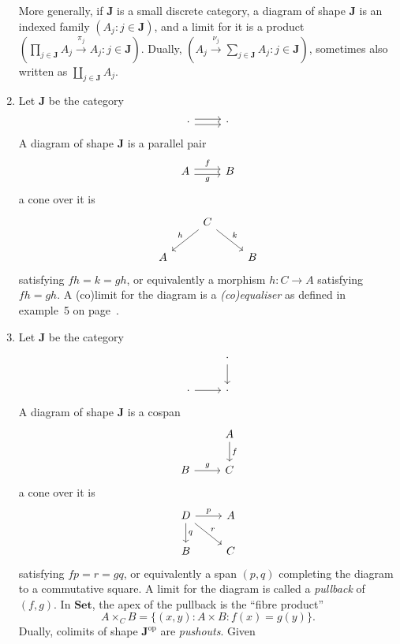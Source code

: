 \documentclass[a4paper]{article}
\renewcommand{\c}[1]{\mathbf{#1}}
\newcommand{\Set}{{\c{Set}}}
\begin{document}
\begin{eg}
\begin{enumerate}
    More generally, if \(\c J\) is a small discrete category, a diagram of shape \(\c J\) is an indexed family \((A_j: j \in \c J)\), and a limit for it is a product \((\prod_{j \in \c J} A_j \xrightarrow{\pi_j} A_j: j \in \c J)\). Dually, \((A_j \xrightarrow{\nu_j} \sum_{j \in \c J} A_j: j\in \c J)\), sometimes also written as \(\coprod_{j \in \c J} A_j\).
  \item Let \(\c J\) be the category
    \[
      \begin{tikzcd}
        \cdot \ar[r, shift left] \ar[r, shift right] & \cdot
      \end{tikzcd}
    \]
    A diagram of shape \(\c J\) is a parallel pair
    \[
      \begin{tikzcd}
        A \ar[r, shift left, "f"] \ar[r, shift right, "g"'] & B
      \end{tikzcd}
    \]
    a cone over it is
    \[
      \begin{tikzcd}
        & C \ar[dl, "h"'] \ar[dr, "k"] \\
        A & & B
      \end{tikzcd}
    \]
    satisfying \(fh = k = gh\), or equivalently a morphism \(h: C \to A\) satisfying \(fh = gh\). A (co)limit for the diagram is a \emph{(co)equaliser} as defined in example~5 on page~\pageref{eg:representable functor}.
  \item Let \(\c J\) be the category
    \[
      \begin{tikzcd}
        & \cdot \ar[d] \\
        \cdot \ar[r] & \cdot
      \end{tikzcd}
    \]
    A diagram of shape \(\c J\) is a cospan
    \[
      \begin{tikzcd}
        & A \ar[d, "f"] \\
        B \ar[r, "g"] & C
      \end{tikzcd}
    \]
    a cone over it is
    \[
      \begin{tikzcd}
        D \ar[r, "p"] \ar[d, "q"] \ar[dr, "r"] & A \\
        B & C
      \end{tikzcd}
    \]
    satisfying \(fp = r = gq\), or equivalently a span \((p, q)\) completing the diagram to a commutative square. A limit for the diagram is called a \emph{pullback} of \((f, g)\). In \(\Set\), the apex of the pullback is the ``fibre product''
    \[
      A \times_C B = \{(x, y): A \times B: f(x) = g(y)\}.
    \]
    Dually, colimits of shape \(\c J^{\text{op}}\) are \emph{pushouts}. Given

\end{enumerate}
\end{eg}
\end{document}
